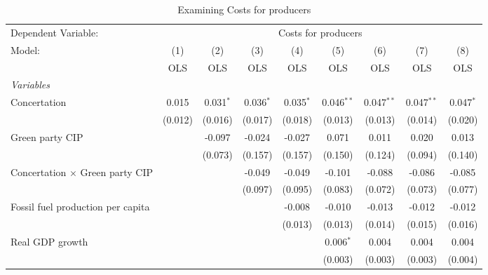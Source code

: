 
\begin{table}[htbp]
   \caption{Examining Costs for producers}
   \centering
   \begin{tabular}{lcccccccc}
      \toprule
      Dependent Variable: & \multicolumn{8}{c}{Costs for producers}\\
      Model:                                  & (1)     & (2)         & (3)         & (4)         & (5)          & (6)          & (7)          & (8)\\  
                                              &  OLS    & OLS         & OLS         & OLS         & OLS          & OLS          & OLS          & OLS\\  
      \midrule
      \emph{Variables}\\
      Concertation                            & 0.015   & 0.031$^{*}$ & 0.036$^{*}$ & 0.035$^{*}$ & 0.046$^{**}$ & 0.047$^{**}$ & 0.047$^{**}$ & 0.047$^{*}$\\   
                                              & (0.012) & (0.016)     & (0.017)     & (0.018)     & (0.013)      & (0.013)      & (0.014)      & (0.020)\\   
      Green party CIP                         &         & -0.097      & -0.024      & -0.027      & 0.071        & 0.011        & 0.020        & 0.013\\   
                                              &         & (0.073)     & (0.157)     & (0.157)     & (0.150)      & (0.124)      & (0.094)      & (0.140)\\   
      Concertation $\times$ Green party CIP   &         &             & -0.049      & -0.049      & -0.101       & -0.088       & -0.086       & -0.085\\   
                                              &         &             & (0.097)     & (0.095)     & (0.083)      & (0.072)      & (0.073)      & (0.077)\\   
      Fossil fuel production per capita       &         &             &             & -0.008      & -0.010       & -0.013       & -0.012       & -0.012\\   
                                              &         &             &             & (0.013)     & (0.013)      & (0.014)      & (0.015)      & (0.016)\\   
      Real GDP growth                         &         &             &             &             & 0.006$^{*}$  & 0.004        & 0.004        & 0.004\\   
                                              &         &             &             &             & (0.003)      & (0.003)      & (0.003)      & (0.004)\\   

\end{tabular}
\end{table}
